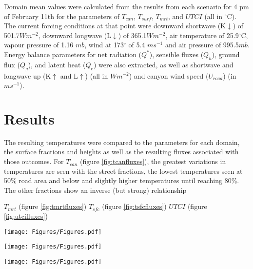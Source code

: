 \documentclass[utf8]{frontiersSCNS} %
\begin{document}
Domain mean values were calculated from the results from each scenario for 4 pm of February 11th for the parameters of $T_{can}$, $T_{surf}$, $T_{mrt}$, and $UTCI$ (all in $^{\circ}$C). The current forcing conditions at that point were downward shortwave (K$\downarrow$) of 501.7$Wm^{-2}$, downward longwave (L$\downarrow$) of 365.1$Wm^{-2}$, air temperature of 25.9$^{\circ}$C, vapour pressure of 1.16 $mb$, wind at 173$^{\circ}$ of 5.4 $ms^{-1}$ and air pressure of 995.5$mb$. Energy balance parameters for net radiation ($Q^{*}$), sensible fluxes ($Q_{h}$), ground flux ($Q_{g}$), and latent heat ($Q_{e}$) were also extracted, as well as shortwave and longwave up (K$\uparrow$ and L$\uparrow$) (all in $Wm^{-2}$) and canyon wind speed ($U_{road}$) (in $ms^{-1}$).

\section{Results}

The resulting temperatures were compared to the parameters for each domain, the surface fractions and heights as well as the resulting fluxes associated with those outcomes. For $T_{can}$ (figure \ref{fig:tcanfluxes}), the greatest variations in temperatures are seen with the street fractions, the lowest temperatures seen at 50\% road area and below and slightly higher temperatures until reaching 80\%. The other fractions show an inverse (but strong) relationship

 $T_{mrt}$ (figure \ref{fig:tmrtfluxes})
  $T_{sfc}$ (figure \ref{fig:tsfcfluxes})
   $UTCI$ (figure \ref{fig:utcifluxes})


\begin{figure*}
\centering
\texttt{[image: Figures/Figures.pdf]}
\caption{\bf Canyon averaged air temperature ($T_{can}$) vs. domain surface fractions and heights and resulting fluxes at 4 pm of February 11, 2004.}
 \label{fig:tcanfluxes}
\end{figure*} 

\begin{figure*}
\centering
\texttt{[image: Figures/Figures.pdf]}
\caption{\bf Canyon averaged mean radiant temperature ($T_{mrt}$) vs. domain surface fractions and heights and resulting fluxes at 4 pm of February 11, 2004.}
 \label{fig:tmrtfluxes}
\end{figure*} 

\begin{figure*}
\centering
\texttt{[image: Figures/Figures.pdf]}
\caption{\bf Canyon averaged surface temperature ($T_{sfc}$) vs. domain surface fractions and heights and resulting fluxes at 4 pm of February 11, 2004.}
 \label{fig:tsfcfluxes}
\end{figure*} 
\end{document}
